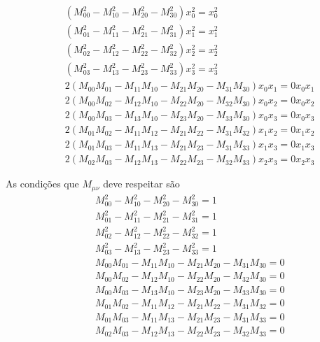 \documentclass[10pt,a4paper]{article}
\begin{document}
\begin{enumerate}
	\begin{eqnarray}
		&& (M_{00}^2-M_{10}^2-M_{20}^2-M_{30}^2)x^2_0 = x^2_0\nonumber \\
		&& (M_{01}^2-M_{11}^2-M_{21}^2-M_{31}^2)x^2_1 = x^2_1\nonumber \\
		&& (M_{02}^2-M_{12}^2-M_{22}^2-M_{32}^2)x^2_2 = x^2_2\nonumber \\
		&& (M_{03}^2-M_{13}^2-M_{23}^2-M_{33}^2)x^2_3 = x^2_3\nonumber \\
		&& 2(M_{00}M_{01}-M_{11}M_{10}-M_{21}M_{20}-M_{31}M_{30})x_0x_1 = 0 x_0x_1\nonumber \\
		&&2(M_{00}M_{02}- M_{12}M_{10}-M_{22}M_{20}-M_{32}M_{30})x_0x_2 = 0 x_0x_2\nonumber \\
		&&2(M_{00}M_{03}- M_{13}M_{10}-M_{23}M_{20}-M_{33}M_{30})x_0x_3 = 0 x_0x_3\nonumber \\
		&&2(M_{01}M_{02}- M_{11}M_{12}-M_{21}M_{22}- M_{31}M_{32})x_1x_2 = 0x_1x_2\nonumber \\
		&& 2(M_{01}M_{03}-M_{11}M_{13}-M_{21}M_{23}-M_{31}M_{33})x_1x_3 = 0 x_1x_3\nonumber \\
		&& 2(M_{02}M_{03}-M_{12}M_{13}-M_{22}M_{23}-M_{32}M_{33})x_2x_3 = 0 x_2x_3 \nonumber
	\end{eqnarray}

	As condições que $ M_{\mu\nu} $ deve respeitar são
	\begin{eqnarray}
		&& M_{00}^2-M_{10}^2-M_{20}^2-M_{30}^2 = 1\nonumber \\
		&&M_{01}^2-M_{11}^2-M_{21}^2-M_{31}^2 = 1\nonumber \\
		&&M_{02}^2-M_{12}^2-M_{22}^2-M_{32}^2 = 1 \nonumber \\
		&& M_{03}^2-M_{13}^2-M_{23}^2-M_{33}^2 = 1\nonumber \\
		&& M_{00}M_{01}-M_{11}M_{10}-M_{21}M_{20}-M_{31}M_{30} = 0 \nonumber \\
		&&M_{00}M_{02}- M_{12}M_{10}-M_{22}M_{20}-M_{32}M_{30}= 0 \nonumber \\
		&&M_{00}M_{03}- M_{13}M_{10}-M_{23}M_{20}-M_{33}M_{30} = 0 \nonumber \\
		&&M_{01}M_{02}- M_{11}M_{12}-M_{21}M_{22}- M_{31}M_{32} = 0\nonumber \\
		&& M_{01}M_{03}-M_{11}M_{13}-M_{21}M_{23}-M_{31}M_{33}= 0 \nonumber \\
		&& M_{02}M_{03}-M_{12}M_{13}-M_{22}M_{23}-M_{32}M_{33} = 0  \nonumber
	\end{eqnarray}
	

\end{enumerate}
\end{document}
